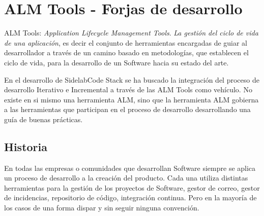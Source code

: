 %
% 

\chapter{ALM Tools - Forjas de desarrollo}
\label{chap:almtools}

\begin{comment}
* ALM Tools
    * Qué es una forja
    * Objetivos
    * Componentes
        * Estudio del arte de forjas
    * Problemática -> administración, costes...
        * Tablas comparativas
    * Algunos ejemplos y sus limitaciones
    * Conclusiones del estudio de forjas
\end{comment}

\par ALM Tools: \emph{Application Lifecycle Management Tools}. \emph{La gesti\'on del ciclo de vida de una aplicaci\'on}, es decir el conjunto de herramientas encargadas de guiar al desarrollador a trav\'es de un camino basado en metodolog\'ias, que establecen el ciclo de vida, para la desarrollo de un Software hacia su estado del arte.

\par En el desarrollo de SidelabCode Stack se ha buscado la integración del proceso de desarrollo Iterativo e Incremental a trav\'es de las ALM Tools como veh\'iculo. No existe en si mismo una herramienta ALM, sino que la herramienta ALM gobierna a las herramientas que participan en el proceso de desarrollo desarrollando una guía de buenas prácticas.

\section{Historia}
\label{sec:historia}

\par En todas las empresas o comunidades que desarrollan Software siempre se aplica un proceso de desarrollo a la creación del producto. Cada una utiliza distintas herramientas para la gesti\'on de los proyectos de Software, gestor de correo, gestor de incidencias, repositorio de c\'odigo, integraci\'on continua. Pero en la mayor\'ia de los casos de una forma dispar y sin seguir ninguna convención.

